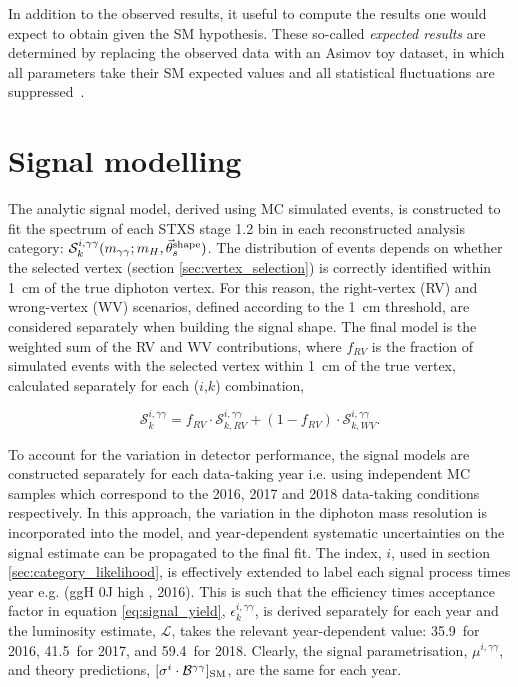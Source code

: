 In addition to the observed results, it useful to compute the results one would expect to obtain given the SM hypothesis. These so-called \textit{expected results} are determined by replacing the observed data with an Asimov toy dataset, in which all parameters take their SM expected values and all statistical fluctuations are suppressed~\cite{Cowan:2010js}.


\section{Signal modelling}\label{sec:sig_modelling}
The analytic signal model, derived using MC simulated events, is constructed to fit the \mgg spectrum of each STXS stage 1.2 bin in each reconstructed analysis category: $\mathcal{S}^{i,\gamma\gamma}_k(m_{\gamma\gamma};m_H,\vec{\theta}^{\rm{shape}}_s)$. The distribution of events depends on whether the selected vertex (section \ref{sec:vertex_selection}) is correctly identified within 1~cm of the true diphoton vertex. For this reason, the right-vertex (RV) and wrong-vertex (WV) scenarios, defined according to the 1~cm threshold, are considered separately when building the signal shape. The final model is the weighted sum of the RV and WV contributions, where $f_{RV}$ is the fraction of simulated events with the selected vertex within 1~cm of the true vertex, calculated separately for each ($i$,$k$) combination,

\begin{equation}
    \mathcal{S}^{i,\gamma\gamma}_k = f_{RV} \cdot \mathcal{S}^{i,\gamma\gamma}_{k,RV} + (1-f_{RV}) \cdot\mathcal{S}^{i,\gamma\gamma}_{k,WV}.
\end{equation}

To account for the variation in detector performance, the signal models are constructed separately for each data-taking year i.e. using independent MC samples which correspond to the 2016, 2017 and 2018 data-taking conditions respectively. In this approach, the variation in the diphoton mass resolution is incorporated into the model, and year-dependent systematic uncertainties on the signal estimate can be propagated to the final fit. The index, $i$, used in section \ref{sec:category_likelihood}, is effectively extended to label each signal process times year e.g. (ggH 0J high \ptH, 2016). This is such that the efficiency times acceptance factor in equation \ref{eq:signal_yield}, $\epsilon_k^{i,\gamma\gamma}$, is derived separately for each year and the luminosity estimate, $\mathcal{L}$, takes the relevant year-dependent value: 35.9~\fbinv for 2016, 41.5~\fbinv for 2017, and 59.4~\fbinv for 2018. Clearly, the signal parametrisation, $\mu^{i,\gamma\gamma}$, and theory predictions, $[\sigma^i \cdot \mathcal{B}^{\gamma\gamma}]_{\rm{SM}}$, are the same for each year.

